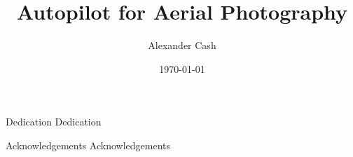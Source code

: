 \documentclass{uoyths}
\begin{document}
\begin{titlepage}[cover=true, title=true, logo=true] 
\title{Autopilot for Aerial Photography}
\author{Alexander Cash}
\date{\today}
\end{titlepage}

\begin{frontMatterEnv}

\begin{chapterEnv}{Dedication}
Dedication
\end{chapterEnv}

\begin{chapterEnv}{Acknowledgements}
Acknowledgements
\end{chapterEnv}



{\singlespacing\tableofcontents}%

\listoffigures

\listoftables

\end{frontMatterEnv}


\begin{mainMatterEnv}











\end{mainMatterEnv}

\begin{backMatterEnv}


\printglossaries



%













\end{backMatterEnv}
\end{document}
